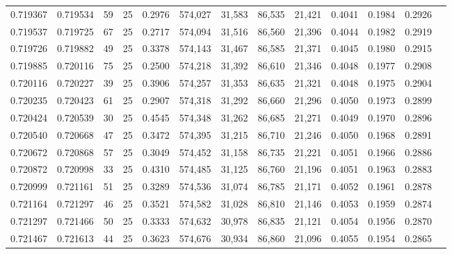 \begin{tabular}{rrrrrrrrrrrrr}
0.719367 & 0.719534 &    59 &  25 &                                     0.2976 & 574,027 &  31,583 &  86,535 &  21,421 & 0.4041 & 0.1984 & 0.2926 \\
0.719537 & 0.719725 &    67 &  25 &                                     0.2717 & 574,094 &  31,516 &  86,560 &  21,396 & 0.4044 & 0.1982 & 0.2919 \\
0.719726 & 0.719882 &    49 &  25 &                                     0.3378 & 574,143 &  31,467 &  86,585 &  21,371 & 0.4045 & 0.1980 & 0.2915 \\
0.719885 & 0.720116 &    75 &  25 &                                     0.2500 & 574,218 &  31,392 &  86,610 &  21,346 & 0.4048 & 0.1977 & 0.2908 \\
0.720116 & 0.720227 &    39 &  25 &                                     0.3906 & 574,257 &  31,353 &  86,635 &  21,321 & 0.4048 & 0.1975 & 0.2904 \\
0.720235 & 0.720423 &    61 &  25 &                                     0.2907 & 574,318 &  31,292 &  86,660 &  21,296 & 0.4050 & 0.1973 & 0.2899 \\
0.720424 & 0.720539 &    30 &  25 &                                     0.4545 & 574,348 &  31,262 &  86,685 &  21,271 & 0.4049 & 0.1970 & 0.2896 \\
0.720540 & 0.720668 &    47 &  25 &                                     0.3472 & 574,395 &  31,215 &  86,710 &  21,246 & 0.4050 & 0.1968 & 0.2891 \\
0.720672 & 0.720868 &    57 &  25 &                                     0.3049 & 574,452 &  31,158 &  86,735 &  21,221 & 0.4051 & 0.1966 & 0.2886 \\
0.720872 & 0.720998 &    33 &  25 &                                     0.4310 & 574,485 &  31,125 &  86,760 &  21,196 & 0.4051 & 0.1963 & 0.2883 \\
0.720999 & 0.721161 &    51 &  25 &                                     0.3289 & 574,536 &  31,074 &  86,785 &  21,171 & 0.4052 & 0.1961 & 0.2878 \\
0.721164 & 0.721297 &    46 &  25 &                                     0.3521 & 574,582 &  31,028 &  86,810 &  21,146 & 0.4053 & 0.1959 & 0.2874 \\
0.721297 & 0.721466 &    50 &  25 &                                     0.3333 & 574,632 &  30,978 &  86,835 &  21,121 & 0.4054 & 0.1956 & 0.2870 \\
0.721467 & 0.721613 &    44 &  25 &                                     0.3623 & 574,676 &  30,934 &  86,860 &  21,096 & 0.4055 & 0.1954 & 0.2865 \\

\end{tabular}
